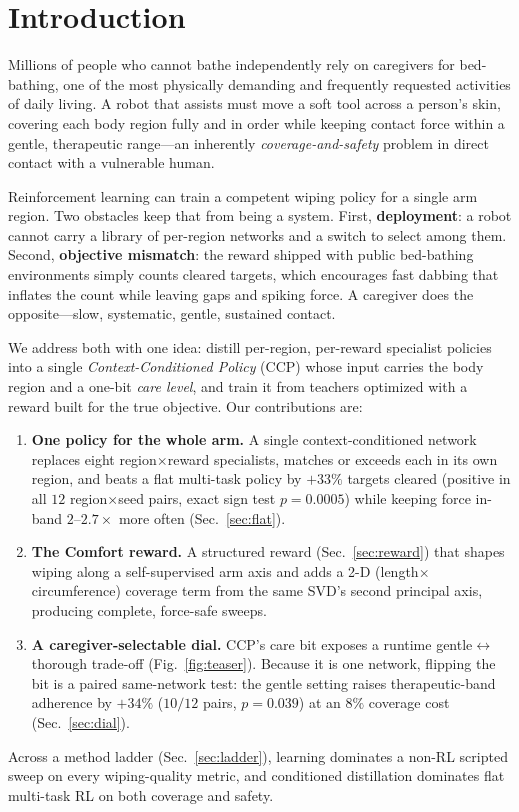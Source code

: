 \documentclass[conference]{IEEEtran}
\begin{document}
\section{Introduction}
Millions of people who cannot bathe independently rely on caregivers for bed-bathing, one of
the most physically demanding and frequently requested activities of daily living. A robot
that assists must move a soft tool across a person's skin, covering each body region fully and
in order while keeping contact force within a gentle, therapeutic range---an inherently
\emph{coverage-and-safety} problem in direct contact with a vulnerable human.

Reinforcement learning can train a competent wiping policy for a single arm region. Two
obstacles keep that from being a system. First, \textbf{deployment}: a robot cannot carry a
library of per-region networks and a switch to select among them. Second, \textbf{objective
mismatch}: the reward shipped with public bed-bathing environments simply counts cleared
targets, which encourages fast dabbing that inflates the count while leaving gaps and spiking
force. A caregiver does the opposite---slow, systematic, gentle, sustained contact.

We address both with one idea: distill per-region, per-reward specialist policies into a
single \emph{Context-Conditioned Policy} (CCP) whose input carries the body region and a
one-bit \emph{care level}, and train it from teachers optimized with a reward built for the
true objective. Our contributions are:
\begin{enumerate}
\item \textbf{One policy for the whole arm.} A single context-conditioned network replaces
eight region$\times$reward specialists, matches or exceeds each in its own region, and beats a
flat multi-task policy by $+33\%$ targets cleared (positive in all $12$ region$\times$seed
pairs, exact sign test $p{=}0.0005$) while keeping force in-band $2$--$2.7\times$ more often
(Sec.~\ref{sec:flat}).
\item \textbf{The Comfort reward.} A structured reward (Sec.~\ref{sec:reward}) that shapes
wiping along a self-supervised arm axis and adds a 2-D (length$\times$circumference) coverage
term from the same SVD's second principal axis, producing complete, force-safe sweeps.
\item \textbf{A caregiver-selectable dial.} CCP's care bit exposes a runtime
gentle$\leftrightarrow$thorough trade-off (Fig.~\ref{fig:teaser}). Because it is one network,
flipping the bit is a paired same-network test: the gentle setting raises therapeutic-band
adherence by $+34\%$ ($10/12$ pairs, $p{=}0.039$) at an $8\%$ coverage cost
(Sec.~\ref{sec:dial}).
\end{enumerate}
Across a method ladder (Sec.~\ref{sec:ladder}), learning dominates a non-RL scripted sweep on
every wiping-quality metric, and conditioned distillation dominates flat multi-task RL on both
coverage and safety.
\end{document}
